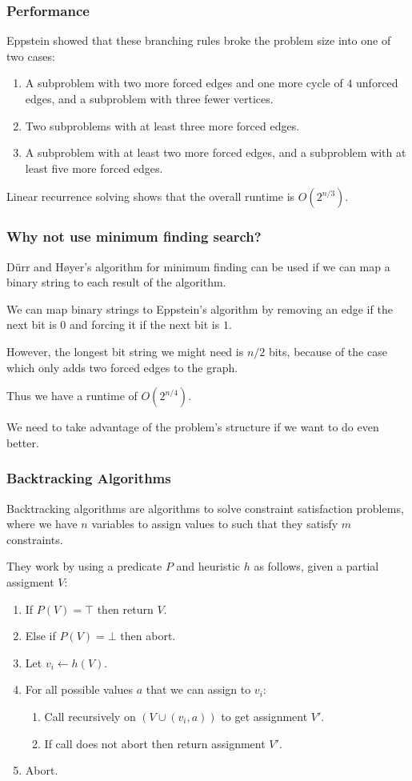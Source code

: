 \documentclass[]{beamer}
\begin{document}
\begin{frame}
\frametitle{Performance}
Eppstein showed that these branching rules broke the problem size into one of two cases:

\begin{enumerate}
\item A subproblem with two more forced edges and one more cycle of $4$ unforced edges, and a subproblem with three fewer vertices.
\item Two subproblems with at least three more forced edges.
\item A subproblem with at least two more forced edges, and a subproblem with at least five more forced edges.
\end{enumerate}

Linear recurrence solving shows that the overall runtime is $O(2^{n/3})$.
\end{frame}

\begin{frame}
\frametitle{Why not use minimum finding search?}
D\"urr and H\o yer's algorithm for minimum finding can be used if we can map a binary string to each result of the algorithm.

We can map binary strings to Eppstein's algorithm by removing an edge if the next bit is $0$ and forcing it if the next bit is $1$.

However, the longest bit string we might need is $n/2$ bits, because of the case which only adds two forced edges to the graph.

Thus we have a runtime of $O(2^{n/4})$.

We need to take advantage of the problem's structure if we want to do even better.
\end{frame}

\begin{frame}
\frametitle{Backtracking Algorithms}
Backtracking algorithms are algorithms to solve constraint satisfaction problems, where we have $n$ variables to assign values to such that they satisfy $m$ constraints.

They work by using a predicate $P$ and heuristic $h$ as follows, given a partial assigment $V$:

\begin{enumerate}
\item If $P(V) = \top$ then return $V$.
\item Else if $P(V) = \bot$ then abort.
\item Let $v_{i} \leftarrow h(V)$.
\item For all possible values $a$ that we can assign to $v_{i}$:
\begin{enumerate}
\item Call recursively on $(V \cup (v_{i}, a))$ to get assignment $V'$.
\item If call does not abort then return assignment $V'$.
\end{enumerate}
\item Abort.
\end{enumerate}
\end{frame}
\end{document}
